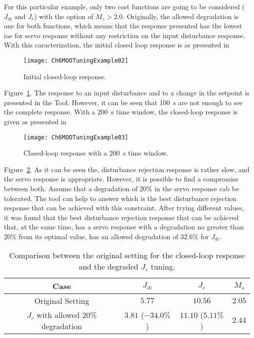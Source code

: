 For this particular example, only two cost functions are going to be considered ($J_{di}$ and $J_r$) with the option of $M_z > 2.0$. Originally, the allowed degradation is one for both functions, which means that the response presented has the lowest \gls{iae} for servo response without any restriction on the input disturbance response. With this caracterization, the initial closed loop response is as presented in
%
\begin{figure}[tb]
	\centering
	\texttt{[image: Ch6MOOTuningExample02]}
	\caption{Initial closed-loop response.}
	\label{fig:Ch6MOOTuningExample02}
\end{figure}
%
Figure~\ref{fig:Ch6MOOTuningExample02}. The response to an input disturbance and to a change in the setpoint is presented in the Tool. However, it can be seen that \SI{100}{\second} are not enough to see the complete response. With a \SI{200}{\second} time window, the closed-loop response is given as presented in %
\begin{figure}
	\centering
	\texttt{[image: Ch6MOOTuningExample03]}
	\caption{Closed-loop response with a \SI{200}{\second} time window.}
	\label{fig:Ch6MOOTuningExample03}
\end{figure}
%
Figure~\ref{fig:Ch6MOOTuningExample03}. As it can be seen the, disturbance rejection response is rather slow, and the servo response is appropriate. However, it is possible to find a compromise between both. Assume that a degradation of 20\% in the servo response cab be tolerated. The tool can help to answer which is the best disturbance rejection response that can be achieved with this constraint. After trying different values, it was found that the best disturbance rejection response that can be achieved that, at the same time, has a servo response with a degradation no greater than 20\% from its optimal value, has an allowed degradation of $32.6\%$ for $J_{di}$.%
%
\begin{table}[tb]
	\centering
	\begin{tabular}{cccc}
		\toprule
		Case & $J_{di}$ & $J_{r}$ & $M_s$\\
		\midrule
		Original Setting & $5.77$ & $10.56$ & $2.05$\\
		$J_r$ with allowed 20\% degradation & $3.81$ ($-34.0\%$) & $11.10$ ($5.11\%$) & $2.44$\\
		\bottomrule
	\end{tabular}
	\caption{Comparison between the original setting for the closed-loop response and the degraded $J_r$ tuning.}
	\label{tab:ExampleMOOTuning}
\end{table}

